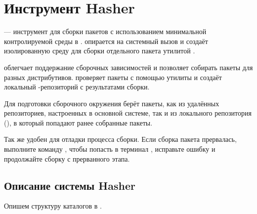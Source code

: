 \chapter{Инструмент Hasher}\label{chapter-hasher}
 --- инструмент для сборки пакетов с использованием минимальной контролируемой 
среды в .  опирается на системный вызов  и создаёт 
изолированную среду для сборки отдельного пакета утилитой .

 облегчает поддержание сборочных зависимостей и позволяет собирать пакеты для 
разных дистрибутивов.  проверяет пакеты с помощью утилиты  
и создаёт локальный -репозиторий с результатами сборки.

Для подготовки сборочного окружения  берёт пакеты, как из удалённых репозиториев, 
настроенных в основной системе, так и из локального репозитория (), 
в который попадают ранее собранные пакеты.

Так же  удобен для отладки процесса сборки. Если сборка пакета прервалась, 
выполните команду , чтобы попасть в терминал , исправьте ошибку 
и продолжайте сборку с прерванного этапа.


\section{Описание системы Hasher}
Опишем структуру каталогов в .


